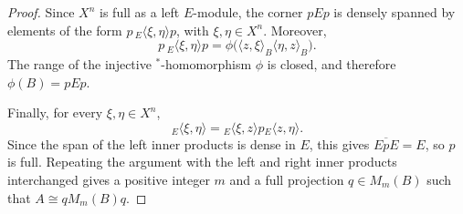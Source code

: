 \documentclass{book}
\begin{document}
\begin{proof}
  Since \(X^n\) is full as a left \(E\)-module, the corner \(pEp\) is
  densely spanned by elements of the form
  \(p\,{}_E\langle\xi,\eta\rangle p\), with \(\xi,\eta\in X^n\). Moreover,
  \[
    p\,{}_E\langle\xi,\eta\rangle p
    =
    \phi\bigl(
      \langle z,\xi\rangle_B\langle\eta,z\rangle_B
    \bigr).
  \]
  The range of the injective \(^*\)-homomorphism \(\phi\) is closed, and
  therefore \(\phi(B)=pEp\).

  Finally, for every \(\xi,\eta\in X^n\),
  \[
    {}_E\langle\xi,\eta\rangle
    =
    {}_E\langle\xi,z\rangle
    p
    {}_E\langle z,\eta\rangle.
  \]
  Since the span of the left inner products is dense in \(E\), this gives
  \(\overline{EpE}=E\), so \(p\) is full. Repeating the argument with the
  left and right inner products interchanged gives a positive integer \(m\)
  and a full projection \(q\in M_m(B)\) such that
  \(A\cong qM_m(B)q\).
\end{proof}
\end{document}
